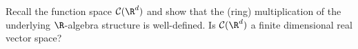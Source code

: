 Recall the function space $\mathcal{C}(\R^{d})$ and show that the (ring) multiplication of the underlying $\R$-algebra structure is well-defined. Is $\mathcal{C}(\R^{d})$ a finite dimensional real vector space?
